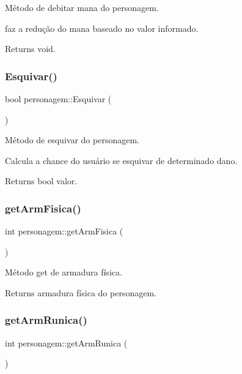 Método de debitar mana do personagem. 

faz a redução do mana baseado no valor informado. \begin{DoxyReturn}{Returns}
void. 
\end{DoxyReturn}
\mbox{\label{classpersonagem_ad03eea0bb9c6eec82fec3202da055309}} 
\subsubsection{\texorpdfstring{Esquivar()}{Esquivar()}}
{\footnotesize\ttfamily bool personagem\+::\+Esquivar (\begin{DoxyParamCaption}{ }\end{DoxyParamCaption})}



Método de esquivar do personagem. 

Calcula a chance do usuário se esquivar de determinado dano. \begin{DoxyReturn}{Returns}
bool valor. 
\end{DoxyReturn}
\mbox{\label{classpersonagem_a4a98195a030276936d22931f7ae9f37a}} 
\subsubsection{\texorpdfstring{get\+Arm\+Fisica()}{getArmFisica()}}
{\footnotesize\ttfamily int personagem\+::get\+Arm\+Fisica (\begin{DoxyParamCaption}{ }\end{DoxyParamCaption})}



Método get de armadura física. 

\begin{DoxyReturn}{Returns}
armadura física do personagem. 
\end{DoxyReturn}
\mbox{\label{classpersonagem_a1cbd2b54e1727407426a92bf2dcad39f}} 
\subsubsection{\texorpdfstring{get\+Arm\+Runica()}{getArmRunica()}}
{\footnotesize\ttfamily int personagem\+::get\+Arm\+Runica (\begin{DoxyParamCaption}{ }\end{DoxyParamCaption})}



